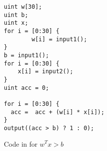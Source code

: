 \begin{figure}
\begin{verbatim}
uint w[30];
uint b;
uint x;
for i = [0:30] {
        w[i] = input1();
}
b = input1();
for i = [0:30] {
    x[i] = input2();
}
uint acc = 0;

for i = [0:30] {
  acc =  acc + (w[i] * x[i]);
}
output((acc > b) ? 1 : 0);
\end{verbatim}
\caption{Code in \tool for $w^Tx >b$}
\label{fig:ex-sml}
\end{figure}

